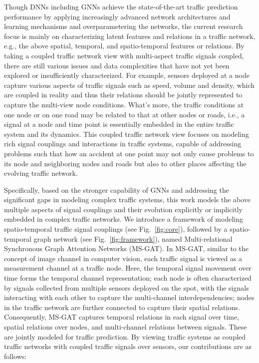 Though DNNs including GNNs achieve the state-of-the-art traffic prediction performance by applying increasingly advanced network architectures and learning mechanisms and overparametering the networks, the current research focus is mainly on characterizing latent features and relations in a traffic network, e.g., the above spatial, temporal, and spatio-temporal features or relations. By taking a coupled traffic network view with multi-aspect traffic signals coupled, there are still various issues and data complexities that have not yet been explored or insufficiently characterized. For example, sensors deployed at a node capture various aspects of traffic signals such as speed, volume and density, which are coupled in reality and thus their relations should be jointly represented to capture the multi-view node conditions. What's more, the traffic conditions at one node or on one road may be related to that at other nodes or roads, i.e., a signal at a node and time point is essentially embedded in the entire traffic system and its dynamics. This coupled traffic network view focuses on modeling rich signal couplings and interactions in traffic systems, capable of addressing problems such that how an accident at one point may not only cause problems to its node and neighboring nodes and roads but also to other places affecting the evolving traffic network.

Specifically, based on the stronger capability of GNNs and addressing the significant gaps in modeling complex traffic systems, this work models the above multiple aspects of signal couplings and their evolution explicitly or implicitly embedded in complex traffic networks. We introduce a framework of modeling spatio-temporal traffic signal couplings (see Fig.~\ref{fig:core}), followed by a spatio-temporal graph network (see Fig.~\ref{fig:framework}), named Multi-relational Synchronous Graph Attention Networks (MS-GAT). In MS-GAT, similar to the concept of image channel in computer vision, each traffic signal is viewed as a measurement channel at a traffic node. Here, the temporal signal movement over time forms the temporal channel representation; each node is often characterized by signals collected from multiple sensors deployed on the spot, with the signals interacting with each other to capture the multi-channel interdependencies; nodes in the traffic network are further connected to capture their spatial relations. Consequently, MS-GAT captures temporal relations in each signal over time, spatial relations over nodes, and multi-channel relations between signals. These are jointly modeled for traffic prediction. By viewing traffic systems as coupled traffic networks with coupled traffic signals over sensors, our contributions are as follows:

